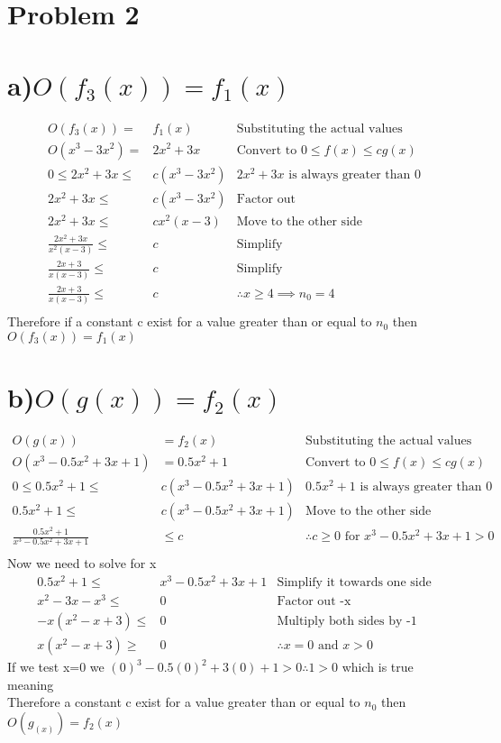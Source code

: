 \documentclass[11pt]{article}
\begin{document}
		\section*{Problem 2}
			\section*{a)$O(f_3(x)) = f_1(x)$}
				\begin{align}
					O(f_3(x)) = &f_1(x)& \text{Substituting the actual values}\\
					O(x^3-3x^2) = &2x^2+3x& \text{Convert to } 0\le f(x) \le cg(x)\\
					0\le 2x^2+3x \le& c(x^3-3x^2)&2x^2+3x \text{ is always greater than 0}\\
					2x^2+3x \le& c(x^3-3x^2) & \text{Factor out}\\
					2x^2+3x \le& cx^2(x-3) & \text{Move to the other side}\\
					\frac{2x^2+3x}{x^2(x-3)}\le& c& \text{Simplify}\\
					\frac{2x+3}{x(x-3)}\le& c& \text{Simplify}\\
					\frac{2x+3}{x(x-3)}\le& c& \therefore x\ge 4 \implies n_0=4\\
				\end{align}
				Therefore if a constant c exist for a value greater than or equal to $n_0$ then $O(f_3(x)) =f_1(x)$
			\section*{b)$O(g(x)) = f_2(x)$}
				\begin{align}
					O(g(x))&= f_2(x)& \text{Substituting the actual values}\\
					O(x^3-0.5x^2+3x+1)&=0.5x^2+1 &\text{Convert to } 0\le f(x) \le cg(x)\\
					0 \le 0.5x^2+1 \le& c(x^3-0.5x^2+3x+1) &0.5x^2+1 \text{ is always greater than 0}\\
					0.5x^2+1 \le& c(x^3-0.5x^2+3x+1) & \text{Move to the other side}\\
					\frac{0.5x^2+1}{x^3-0.5x^2+3x+1}&\le c &\therefore c\ge 0 \text{ for } x^3-0.5x^2+3x+1>0\\
				\end{align}
				Now we need to solve for x 
				\begin{align}
					0.5x^2+1 \le& x^3 - 0.5x^2+3x+1&\text{Simplify it towards one side}\\
					x^2 -3x-x^3\le& 0&\text{Factor out -x}\\
					-x(x^2-x+3)\le&0& \text{Multiply both sides by -1}\\
					x(x^2-x+3)\ge&0 &\therefore x=0 \text{ and } x>0
				\end{align}
				If we test x=0 we $(0)^3-0.5(0)^2+3(0)+1>0 \therefore 1>0$ which is true meaning\\
				Therefore a constant c exist for a value greater than or equal to $n_0$ then $O(g_(x)) =f_2(x)$
				
\end{document}
